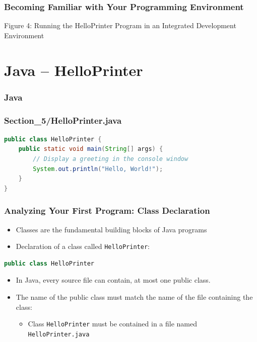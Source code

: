 \documentclass{beamer}
\begin{document}
\begin{frame}[t,fragile] \frametitle{Becoming Familiar with Your Programming Environment} %
    \begin{center}
        Figure 4: Running the HelloPrinter Program in an Integrated Development Environment
    \end{center}
\end{frame}

\section{Java -- HelloPrinter}

\begin{frame}[t,fragile] \frametitle{Java} %
\end{frame}

\begin{frame}[t,fragile] \frametitle{Section\_5/HelloPrinter.java} %
\begin{lstlisting}[language=Java]
public class HelloPrinter {
    public static void main(String[] args) {
        // Display a greeting in the console window
        System.out.println("Hello, World!");
    }
}
\end{lstlisting}
\end{frame}

\begin{frame}[t,fragile] \frametitle{Analyzing Your First Program: Class Declaration} %
    \begin{itemize}
        \item Classes are the fundamental building blocks of Java programs
        \item Declaration of a class called \texttt{HelloPrinter}:
    \end{itemize}
    \begin{lstlisting}[language=Java]
public class HelloPrinter
    \end{lstlisting}
    \begin{itemize}
        \item In Java, every source file can contain, at most one public class.
        \item The name of the public class must match the name of the file containing the class:
        \begin{itemize}
            \item Class \texttt{HelloPrinter} must be contained in a file named \texttt{HelloPrinter.java}
        \end{itemize}
    \end{itemize}
\end{frame}
\end{document}
